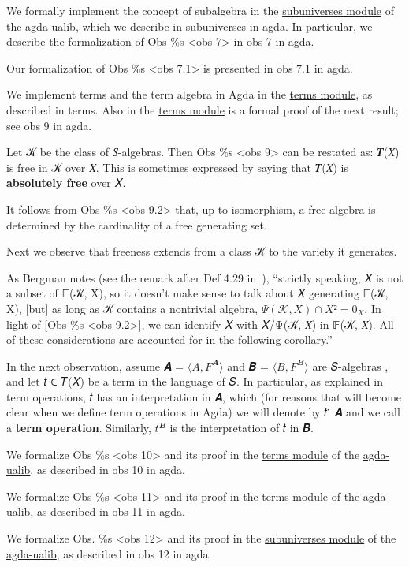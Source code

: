 \documentclass[sigplan,screen]{acmart}
\begin{document}
We formally implement the concept of subalgebra in the \href{}{subuniverses module} of the \href{}{agda-ualib}, which we describe in subuniverses in agda. In particular, we describe the formalization of Obs \%s \textless{}obs 7\textgreater{} in obs 7 in agda.

Our formalization of Obs \%s \textless{}obs 7.1\textgreater{} is presented in obs 7.1 in agda.

We implement terms and the term algebra in Agda in the \href{}{terms module}, as described in terms. Also in the \href{}{terms module} is a formal proof of the next result; see obs 9 in agda.

Let 𝒦 be the class of 𝑆-algebras. Then Obs \%s \textless{}obs 9\textgreater{} can be restated as: 𝑻(𝑋) is free
in 𝒦 over 𝑋. This is sometimes expressed by saying that 𝑻(𝑋) is \textbf{absolutely free} over 𝑋.

It follows from Obs \%s \textless{}obs 9.2\textgreater{} that, up to isomorphism, a free algebra is determined by the cardinality of a free generating set.

Next we observe that freeness extends from a class 𝒦 to the variety it generates.

As Bergman notes (see the remark after Def 4.29 in~\cite{Bergman:2012}), ``strictly speaking, 𝑋 is not a subset of 𝔽(𝒦, X), so it doesn't make sense to talk about 𝑋 generating 𝔽(𝒦, X), {[}but{]} as long as 𝒦 contains a nontrivial algebra, \(Ψ(𝒦, 𝑋) ∩ 𝑋² = 0_X\). In light of {[}Obs \%s \textless{}obs 9.2\textgreater{}{]}, we can identify 𝑋 with 𝑋/Ψ(𝒦, 𝑋) in 𝔽(𝒦, 𝑋). All of these considerations are accounted for in the following corollary.''

In the next observation, assume 𝑨 = \(⟨A, F^𝑨⟩\) and 𝑩 = \(⟨B, F^𝑩⟩\) are 𝑆-algebras , and let 𝑡 ∈ 𝑇(𝑋) be a term in the language of 𝑆. In particular, as explained in term operations, 𝑡 has an interpretation in 𝑨, which (for reasons that will become clear when we define term operations in Agda) we will denote by 𝑡 ̇ 𝑨 and we call a \textbf{term operation}. Similarly, \(t^𝑩\) is the interpretation of 𝑡 in 𝑩.

We formalize Obs \%s \textless{}obs 10\textgreater{} and its proof in the \href{}{terms module} of the \href{}{agda-ualib}, as described in obs 10 in agda.

We formalize Obs \%s \textless{}obs 11\textgreater{} and its proof in the \href{}{terms module} of the \href{}{agda-ualib}, as described in obs 11 in agda.

We formalize Obs. \%s \textless{}obs 12\textgreater{} and its proof in the \href{}{subuniverses module} of the \href{}{agda-ualib}, as described in obs 12 in agda.
\end{document}
